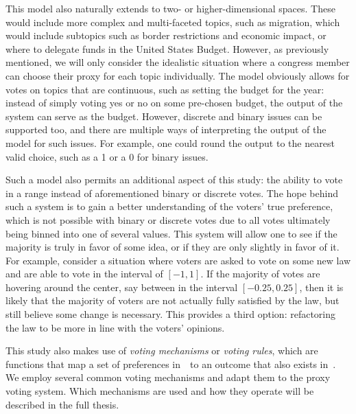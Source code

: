 This model also naturally extends to two- or higher-dimensional spaces.
These would include more complex and multi-faceted topics, such as migration, which
would include subtopics such as border restrictions and economic impact, or where to
delegate funds in the United States Budget.
However, as previously mentioned, we will only consider the idealistic situation
where a congress member can choose their proxy for each topic individually.
The model obviously allows for votes on topics that are continuous, such as setting the
budget for the year: instead of simply voting yes or no on some pre-chosen budget,
the output of the system can serve as the budget.
However, discrete and binary issues can be supported too, and there are multiple
ways of interpreting the output of the model for such issues.
For example, one could round the output to the nearest valid choice, such as a 1 or a
0 for binary issues.

Such a model also permits an additional aspect of this study: the ability to vote in
a range instead of aforementioned binary or discrete votes.
The hope behind such a system is to gain a better understanding of the voters'
true preference, which is not possible with binary or discrete votes due to all votes
ultimately being binned into one of several values.
This system will allow one to see if the majority is truly in favor of some idea, or
if they are only slightly in favor of it.
For example, consider a situation where voters are asked to vote on some new law and
are able to vote in the interval of $[-1, 1]$.
If the majority of votes are hovering around the center, say between in the interval
$[-0.25, 0.25]$, then it is likely that the majority of voters are not actually fully
satisfied by the law, but still believe some change is necessary.
This provides a third option: refactoring the law to be more in line with the
voters' opinions.

This study also makes use of \textit{voting mechanisms} or \textit{voting rules},
which are functions that map a set of preferences in~\systemspace\ to an outcome that
also exists in~\systemspace.
%
%
We employ several common voting mechanisms and adapt them to the proxy voting system.
Which mechanisms are used and how they operate will be described in the full thesis.

